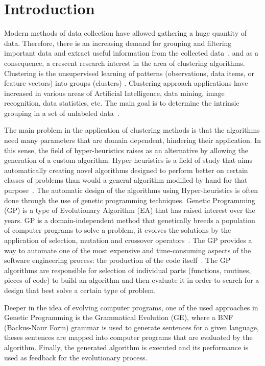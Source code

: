 \documentclass[conference,compsoc]{IEEEtran}
\begin{document}
\IEEEpeerreviewmaketitle

\section{Introduction}

Modern methods of data collection have allowed gathering a huge quantity of data. Therefore, there is an increasing demand for grouping and filtering important data and extract useful information from the collected data~\cite{ahalya2015data}, and as a consequence, a crescent research interest in the area of clustering algorithms. Clustering is the unsupervised learning of patterns (observations, data items, or feature vectors) into groups (clusters) \cite{jain1988algorithms}. Clustering approach applications have increased in various areas of Artificial Intelligence, data mining, image recognition, data statistics, etc. The main goal is to determine the intrinsic grouping in a set of unlabeled data~\cite{ahalya2015data}.

The main problem in the application of clustering methods is that the algorithms need many parameters that are domain dependent, hindering their application. In this sense, the field of hyper-heuristics raises as an alternative by allowing the generation of a custom algorithm. Hyper-heuristics is a field of study that aims automatically creating novel algorithms designed to perform better on certain classes of problems than would a general algorithm modified by hand for that purpose~\cite{harris2015comparison}. The automatic design of the algorithms using Hyper-heuristics is  often done through the use of genetic programming techniques. Genetic Programming (GP) is a type of Evolutionary Algorithm (EA) that has raised interest over the years. GP is a domain-independent method that genetically breeds a population of computer programs to solve a problem, it evolves the solutions by the application of selection, mutation and crossover operators~\cite{poli2014genetic}. The GP provides a way to automate one of the most expensive and time-consuming aspects of the software engineering process: the production of the code itself~\cite{langdon2015optimising}. The GP algorithms are responsible for selection of individual parts (functions, routines, pieces of code) to build an algorithm and then evaluate it in order to search for a design that best solve a certain type of problem.

Deeper in the idea of evolving computer programs, one of the used approaches in Genetic Programming is the Grammatical Evolution (GE), where a BNF (Backus-Naur Form) grammar is used to generate sentences for a given language, theses sentences are mapped into  computer programs that are evaluated by the algorithm. Finally, the generated algorithm is executed and its performance is used as feedback for the evolutionary process.
\end{document}
